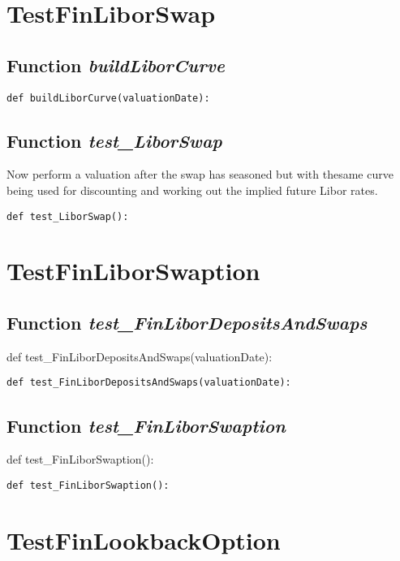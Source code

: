 \documentclass[twoside,11pt]{book}
\begin{document}
\newpage
\section{TestFinLiborSwap}

\subsection{Function {\it buildLiborCurve}}


\begin{lstlisting}
def buildLiborCurve(valuationDate):
\end{lstlisting}

\subsection{Function {\it test\_LiborSwap}}
Now perform a valuation after the swap has seasoned but with thesame curve being used for discounting and working out the implied future Libor rates. 

\begin{lstlisting}
def test_LiborSwap(): 
\end{lstlisting}


\newpage
\section{TestFinLiborSwaption}

\subsection{Function {\it test\_FinLiborDepositsAndSwaps}}
def test\_FinLiborDepositsAndSwaps(valuationDate):

\begin{lstlisting}
def test_FinLiborDepositsAndSwaps(valuationDate):
\end{lstlisting}

\subsection{Function {\it test\_FinLiborSwaption}}
def test\_FinLiborSwaption():

\begin{lstlisting}
def test_FinLiborSwaption():
\end{lstlisting}


\newpage
\section{TestFinLookbackOption}
\end{document}
